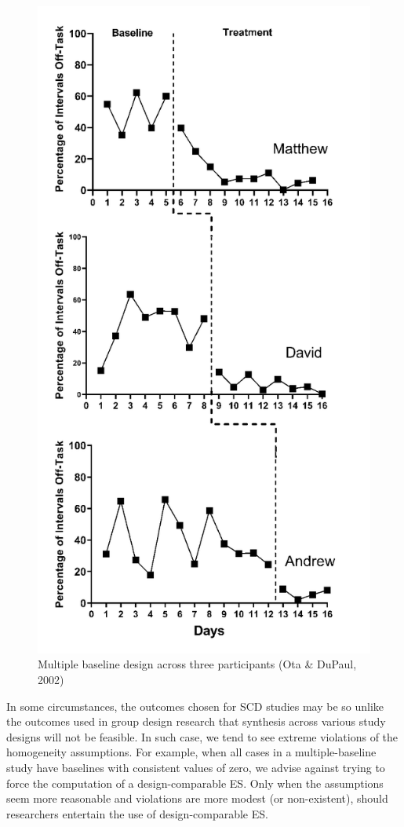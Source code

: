 \documentclass[
]{book}
\begin{document}
\begin{figure}
\includegraphics[width=0.75\linewidth]{images/Ota-DuPaul-2002} \caption{Multiple baseline design across three participants (Ota \& DuPaul, 2002)}\label{fig:Ota-DuPaul-2002}
\end{figure}

In some circumstances, the outcomes chosen for SCD studies may be so unlike the outcomes used in group design research that synthesis across various study designs will not be feasible. In such case, we tend to see extreme violations of the homogeneity assumptions. For example, when all cases in a multiple-baseline study have baselines with consistent values of zero, we advise against trying to force the computation of a design-comparable ES. Only when the assumptions seem more reasonable and violations are more modest (or non-existent), should researchers entertain the use of design-comparable ES.
\end{document}
